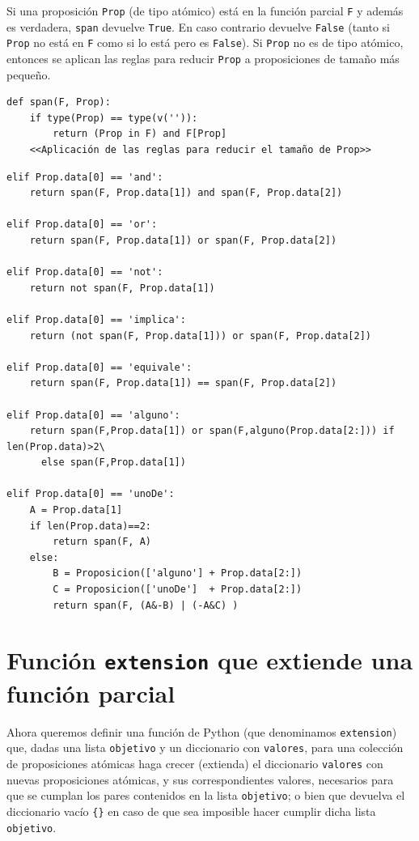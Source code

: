 \documentclass[10pt,a4paper]{report}
\begin{document}
Si una proposición \texttt{Prop} (de tipo atómico) está en la función parcial \texttt{F} y además es verdadera, \texttt{span} devuelve \texttt{True}. 
En caso contrario devuelve \texttt{False} (tanto si \texttt{Prop} no está en \texttt{F} como si lo está pero es \texttt{False}). 
Si \texttt{Prop} no es de tipo atómico, entonces se aplican las reglas para reducir \texttt{Prop} a proposiciones de tamaño más pequeño.

\begin{verbatim}
def span(F, Prop):    
    if type(Prop) == type(v('')):
        return (Prop in F) and F[Prop] 
    <<Aplicación de las reglas para reducir el tamaño de Prop>>

\end{verbatim}

\begin{verbatim}
elif Prop.data[0] == 'and':
    return span(F, Prop.data[1]) and span(F, Prop.data[2])

elif Prop.data[0] == 'or':
    return span(F, Prop.data[1]) or span(F, Prop.data[2])

elif Prop.data[0] == 'not':
    return not span(F, Prop.data[1])
    
elif Prop.data[0] == 'implica':
    return (not span(F, Prop.data[1])) or span(F, Prop.data[2]) 
    
elif Prop.data[0] == 'equivale':
    return span(F, Prop.data[1]) == span(F, Prop.data[2]) 

elif Prop.data[0] == 'alguno':
    return span(F,Prop.data[1]) or span(F,alguno(Prop.data[2:])) if len(Prop.data)>2\
      else span(F,Prop.data[1])

elif Prop.data[0] == 'unoDe':
    A = Prop.data[1]
    if len(Prop.data)==2:
        return span(F, A)
    else:
        B = Proposicion(['alguno'] + Prop.data[2:])
        C = Proposicion(['unoDe']  + Prop.data[2:])
        return span(F, (A&-B) | (-A&C) ) 
\end{verbatim}
\chapter{Función  \texttt{extension} que extiende una función parcial}
\label{sec:org8c4d1fb}

Ahora queremos definir una función de Python (que denominamos \texttt{extension}) que, 
dadas una lista \texttt{objetivo} y un diccionario con \texttt{valores}, 
para una colección de proposiciones atómicas haga crecer (extienda) el diccionario \texttt{valores} con nuevas proposiciones atómicas, y sus correspondientes valores, 
necesarios para que se cumplan los pares contenidos en la lista \texttt{objetivo};
o bien que devuelva el diccionario vacío \texttt{\{\}} en caso de que sea imposible hacer cumplir dicha lista \texttt{objetivo}.
\end{document}

